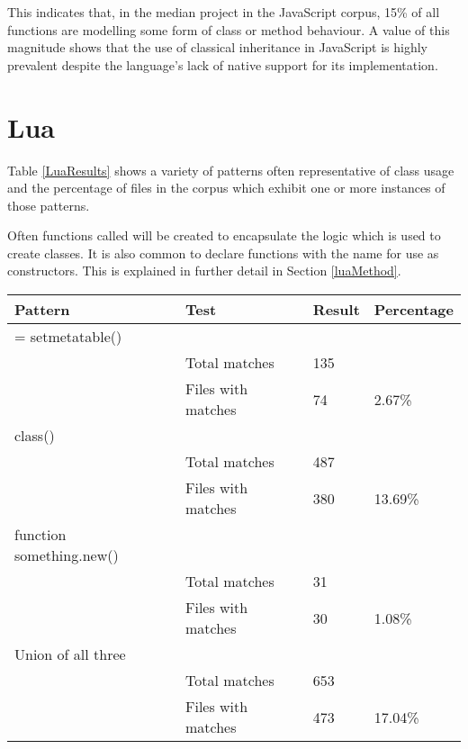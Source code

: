 This indicates that, in the median project in the JavaScript corpus, 15\% of all functions are modelling some form of class or method behaviour. A value of this magnitude shows that the use of classical inheritance in JavaScript is highly prevalent despite the language's lack of native support for its implementation.

\section{Lua}
Table \ref{LuaResults} shows a variety of patterns often representative of class usage and the percentage of files in the corpus which exhibit one or more instances of those patterns.\newline

Often functions called  will be created to encapsulate the  logic which is used to create classes. It is also common to declare functions with the name  for use as constructors. This is explained in further detail in Section \ref{luaMethod}.

\begin{center}
	\label{LuaResults}
	\begin{tabular}{|l|l|l|l|}
		\hline
		Pattern                 & Test               & Result & Percentage \\ \hline
		= setmetatable()        &                    &        &            \\ \hline
		& Total matches      & 135    &            \\ \hline
		& Files with matches & 74     & 2.67\%     \\ \hline
		class()                  &                    &        &            \\ \hline
		& Total matches      & 487    &            \\ \hline
		& Files with matches & 380    & 13.69\%    \\ \hline
		function something.new() &                    &        &            \\ \hline
		& Total matches      & 31     &            \\ \hline
		& Files with matches & 30     & 1.08\%     \\ \hline
		Union of all three      &                    &        &            \\ \hline
		& Total matches      & 653    &            \\ \hline
		& Files with matches & 473    & 17.04\%    \\ \hline
	\end{tabular}
	\newline
	\newline
\end{center}

